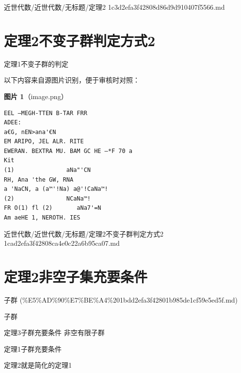 \begin{note}[来源路径]

近世代数/近世代数/无标题/定理2 1c3d2efa3f42808d86d9d910407f5566.md

\end{note}

\section*{定理2不变子群判定方式2}

\begin{theorem}[定理2不变子群判定方式2]

定理1不变子群的判定

\end{theorem}

\begin{note}
以下内容来自源图片识别，便于审核时对照：

\textbf{图片 1}（image.png）
\begin{Verbatim}[fontsize=\small]
EEL —MEGH-TTEN B-TAR FRR
ADEE:
a€G, nEN>ana'€N
EM ARIPO, JEL ALR. RITE
EWERAN. BEXTRA MU. BAM GC HE —*F 70 a
Kit
(1)               aNa"'CN
RH, Ana 'the GW, RNA
a 'NaCN, a (a™'!Na) a@'!CaNa™!
(2)               NCaNa™!
FR O(1) fl (2)       aNa7'=N
Am aeHE 1, NEROTH. IES
\end{Verbatim}

\end{note}

\begin{note}[来源路径]

近世代数/近世代数/无标题/定理2不变子群判定方式2 1cad2efa3f42808ca4e0c22a6b95ca07.md

\end{note}

\section*{定理2非空子集充要条件}

\begin{note}[来源上级主题]

子群 (\%E5\%AD\%90\%E7\%BE\%A4\%201bdd2efa3f42801b985de1cf59e5ed5f.md)

\end{note}

\begin{theorem}[定理2非空子集充要条件]

子群

定理3子群充要条件 非空有限子群

定理1子群充要条件

定理2就是简化的定理1

\end{theorem}

